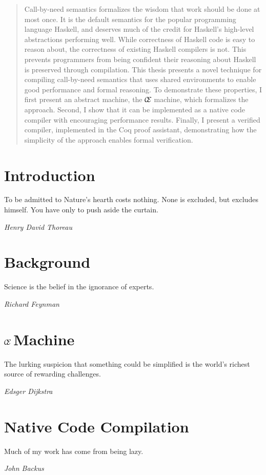 \documentclass[botnum]{unmeethesis}
\def\ce{$\mathcal{\mathcal{C} \mskip -4mu \mathcal{E}} \mskip 4mu$}
\begin{document}
\begin{abstract}
Call-by-need semantics formalizes the wisdom that work should be done at most
once. It is the default semantics for the popular programming language Haskell,
and deserves much of the credit for Haskell's high-level abstractions performing
well.  While correctness of Haskell code is easy to reason about, the
correctness of existing Haskell compilers is not.  This prevents programmers
from being confident their reasoning about Haskell is preserved through
compilation. This thesis presents a novel technique for compiling call-by-need
semantics that uses shared environments to enable good performance and formal
reasoning. To demonstrate these properties, I first present an abstract machine,
the \ce machine, which formalizes the approach. Second, I show that it can be
implemented as a native code compiler with encouraging performance results.
Finally, I present a verified compiler, implemented in the Coq proof assistant,
demonstrating how the simplicity of the approach enables formal verification.  
\clearpage %
\end{abstract}

\tableofcontents
\listoffigures

\mainmatter

\chapter{Introduction}\label{chap:intro}
\epigraph{To be admitted to Nature's hearth costs nothing. None is excluded, but
excludes himself. You have only to push aside the curtain.}{\textit{Henry David
Thoreau}}


\chapter{Background}\label{chap:background}
\epigraph{Science is the belief in the ignorance of experts.}{\textit{Richard
Feynman}}


\chapter{\ce Machine}\label{chap:ce}
\epigraph{The lurking suspicion that something could be simplified is the
world's richest source of rewarding challenges.}{\textit{Edsger Dijkstra}}




\chapter{Native Code Compilation}\label{chap:cem}
\epigraph{Much of my work has come from being lazy.}{\textit{John Backus}}





\end{document}
